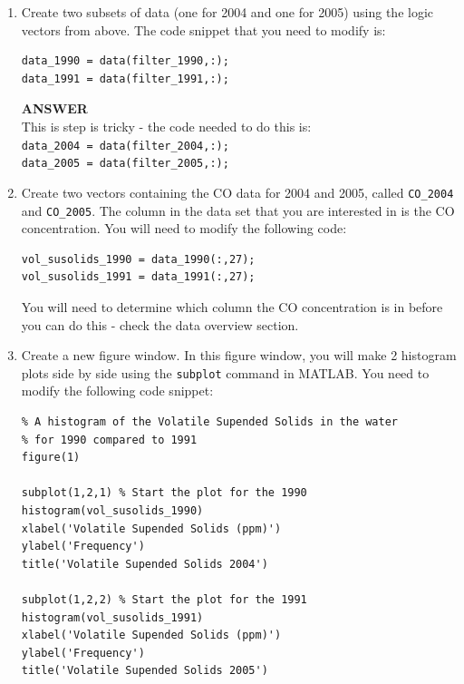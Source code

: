 \documentclass[12pt]{article}
\begin{document}
\begin{enumerate}
\item Create two subsets of data (one for 2004 and one for 2005) using the logic vectors from above. The code snippet that you need to modify is:
\vspace{-0.4cm}
\begin{lstlisting}
data_1990 = data(filter_1990,:);
data_1991 = data(filter_1991,:);
\end{lstlisting}
\begin{tcolorbox}
\textbf{ANSWER}\\

\vspace{-0.3cm}
This is step is tricky - the code needed to do this is:\\
\verb|data_2004 = data(filter_2004,:);|\\
\verb|data_2005 = data(filter_2005,:);|
\end{tcolorbox}

\item Create two vectors containing the CO data for 2004 and 2005, called \verb|CO_2004| and \verb|CO_2005|. The column in the data set that you are interested in is the CO concentration. You will need to modify the following code:
\vspace{-0.4cm}
\begin{lstlisting}
vol_susolids_1990 = data_1990(:,27);
vol_susolids_1991 = data_1991(:,27);
\end{lstlisting}

You will need to determine which column the CO concentration is in before you can do this - check the data overview section.

\item Create a new figure window. In this figure window, you will make 2 histogram plots side by side using the \verb|subplot| command in MATLAB. You need to modify the following code snippet:
\vspace{-0.4cm}
\begin{lstlisting}
% A histogram of the Volatile Supended Solids in the water
% for 1990 compared to 1991
figure(1)

subplot(1,2,1) % Start the plot for the 1990
histogram(vol_susolids_1990)
xlabel('Volatile Supended Solids (ppm)')
ylabel('Frequency')
title('Volatile Supended Solids 2004')

subplot(1,2,2) % Start the plot for the 1991
histogram(vol_susolids_1991)
xlabel('Volatile Supended Solids (ppm)')
ylabel('Frequency')
title('Volatile Supended Solids 2005')
\end{lstlisting}


\end{enumerate}
\end{document}
